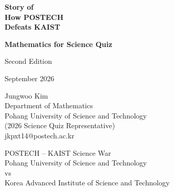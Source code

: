 \documentclass[11pt,oneside]{book}
\newcommand{\institutiontext}[2]{%
    \texorpdfstring{\textcolor{#1}{#2}}{#2}%
}
\DeclareRobustCommand{\POSTECH}{\institutiontext{POSTECHRed}{POSTECH}}
\DeclareRobustCommand{\PohangUniversityOfScienceAndTechnology}{%
    \institutiontext{POSTECHRed}{Pohang University of Science and Technology}%
}
\DeclareRobustCommand{\KAIST}{\institutiontext{KAISTBlue}{KAIST}}
\DeclareRobustCommand{\KoreaAdvancedInstituteOfScienceAndTechnology}{%
    \institutiontext{KAISTBlue}{Korea Advanced Institute of Science and Technology}%
}
\theoremstyle{sciencequizdefinition}
\theoremstyle{sciencequizplain}
\theoremstyle{sciencequizdefinition}
\theoremstyle{sciencequizsameline}
\begin{document}

    \begin{titlepage}
        \centering

        \vspace*{2.4cm}

        {\Huge\bfseries Story of\\[0.35em]
        How \POSTECH\\[0.35em]
        Defeats \KAIST\par}

        \vspace{0.7cm}

        {\LARGE\bfseries Mathematics for Science Quiz\par}

        \vspace{0.55cm}

        {\large Second Edition\par}
        {\normalsize September 2026\par}

        \vspace{1.15cm}

        {\large
        Jungwoo Kim\\
        Department of Mathematics\\
        \PohangUniversityOfScienceAndTechnology\\
        (2026 Science Quiz Representative)\\
        jkpxt14@postech.ac.kr
        \par}

        \vfill

        {\large
        \POSTECH--\KAIST{} Science War\\[0.7em]
        \PohangUniversityOfScienceAndTechnology\\
        vs\\
        \KoreaAdvancedInstituteOfScienceAndTechnology
        \par}

        \vspace{0.3cm}

    \end{titlepage}


    

    

    \tableofcontents

    
\end{document}
